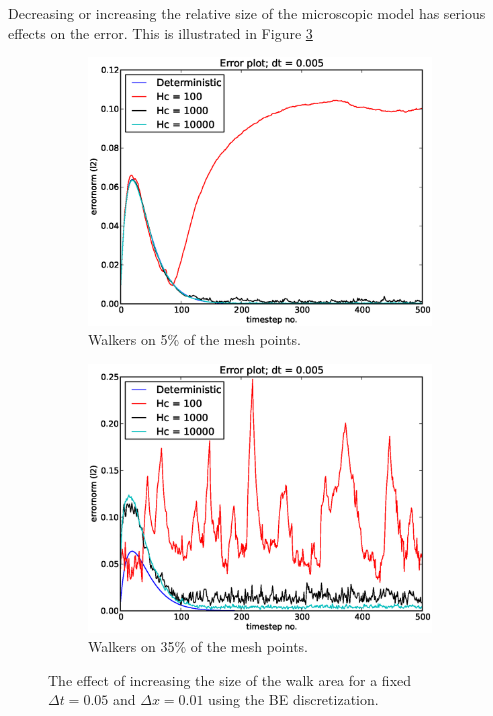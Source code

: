 Decreasing or increasing the relative size of the microscopic model has serious effects on the error. This is illustrated in Figure \ref{testing_walk_area_size_BE}

\begin{figure}[H]
\centering
\begin{subfigure}[b]{0.48\textwidth}
 \includegraphics[width=\textwidth]{../results/experiment_16042014_1139_convergence_tests_etc/results/errorplot.eps}
 \caption{Walkers on 5\% of the mesh points.}
 \label{errorplot_BE1D_walk_5_percent}
\end{subfigure}
\begin{subfigure}[b]{0.48\textwidth}
 \includegraphics[width=\textwidth]{../results/experiment_16042014_1202_tests_35percent_walkers/results/errorplot.eps}
 \caption{Walkers on 35\% of the mesh points.}
 \label{errorplot_BE1D_walk_35_percent}
\end{subfigure}
\caption[Effects of increasing relative size of walk area]{The effect of increasing the size of the walk area for a fixed $\Delta t = 0.05$ and $\Delta x = 0.01$ using the BE discretization.}
\label{testing_walk_area_size_BE}
\end{figure}